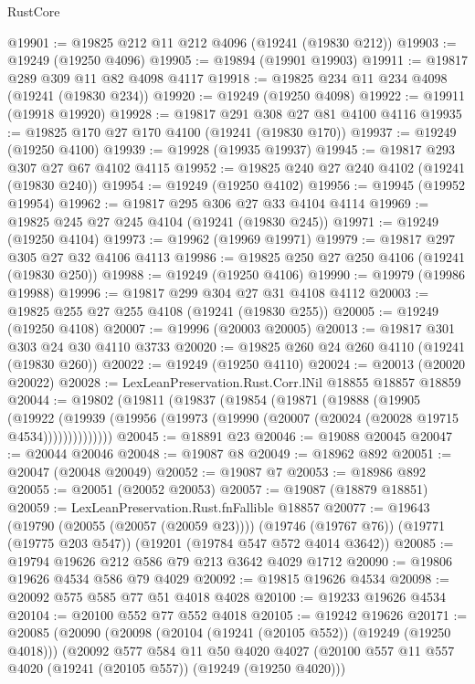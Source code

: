 \begin{lexlean}{RustCore}
\begin{coremodule}
@19901 := @19825 @212 @11 @212 @4096 (@19241 (@19830 @212))
@19903 := @19249 (@19250 @4096)
@19905 := @19894 (@19901 @19903)
@19911 := @19817 @289 @309 @11 @82 @4098 @4117
@19918 := @19825 @234 @11 @234 @4098 (@19241 (@19830 @234))
@19920 := @19249 (@19250 @4098)
@19922 := @19911 (@19918 @19920)
@19928 := @19817 @291 @308 @27 @81 @4100 @4116
@19935 := @19825 @170 @27 @170 @4100 (@19241 (@19830 @170))
@19937 := @19249 (@19250 @4100)
@19939 := @19928 (@19935 @19937)
@19945 := @19817 @293 @307 @27 @67 @4102 @4115
@19952 := @19825 @240 @27 @240 @4102 (@19241 (@19830 @240))
@19954 := @19249 (@19250 @4102)
@19956 := @19945 (@19952 @19954)
@19962 := @19817 @295 @306 @27 @33 @4104 @4114
@19969 := @19825 @245 @27 @245 @4104 (@19241 (@19830 @245))
@19971 := @19249 (@19250 @4104)
@19973 := @19962 (@19969 @19971)
@19979 := @19817 @297 @305 @27 @32 @4106 @4113
@19986 := @19825 @250 @27 @250 @4106 (@19241 (@19830 @250))
@19988 := @19249 (@19250 @4106)
@19990 := @19979 (@19986 @19988)
@19996 := @19817 @299 @304 @27 @31 @4108 @4112
@20003 := @19825 @255 @27 @255 @4108 (@19241 (@19830 @255))
@20005 := @19249 (@19250 @4108)
@20007 := @19996 (@20003 @20005)
@20013 := @19817 @301 @303 @24 @30 @4110 @3733
@20020 := @19825 @260 @24 @260 @4110 (@19241 (@19830 @260))
@20022 := @19249 (@19250 @4110)
@20024 := @20013 (@20020 @20022)
@20028 := LexLeanPreservation.Rust.Corr.lNil @18855 @18857 @18859
@20044 := @19802
    (@19811
      (@19837
        (@19854
          (@19871
            (@19888
              (@19905
                (@19922
                  (@19939 (@19956 (@19973 (@19990 (@20007 (@20024 (@20028 @19715 @4534))))))))))))))
@20045 := @18891 @23
@20046 := @19088 @20045
@20047 := @20044 @20046
@20048 := @19087 @8
@20049 := @18962 @892
@20051 := @20047 (@20048 @20049)
@20052 := @19087 @7
@20053 := @18986 @892
@20055 := @20051 (@20052 @20053)
@20057 := @19087 (@18879 @18851)
@20059 := LexLeanPreservation.Rust.fnFallible @18857
@20077 := @19643
    (@19790 (@20055 (@20057 (@20059 @23))))
    (@19746 (@19767 @76))
    (@19771 (@19775 @203 @547))
    (@19201 (@19784 @547 @572 @4014 @3642))
@20085 := @19794 @19626 @212 @586 @79 @213 @3642 @4029 @1712
@20090 := @19806 @19626 @4534 @586 @79 @4029
@20092 := @19815 @19626 @4534
@20098 := @20092 @575 @585 @77 @51 @4018 @4028
@20100 := @19233 @19626 @4534
@20104 := @20100 @552 @77 @552 @4018
@20105 := @19242 @19626
@20171 := @20085
    (@20090
      (@20098
        (@20104 (@19241 (@20105 @552)) (@19249 (@19250 @4018)))
        (@20092
          @577
          @584
          @11
          @50
          @4020
          @4027
          (@20100 @557 @11 @557 @4020 (@19241 (@20105 @557)) (@19249 (@19250 @4020)))

\end{coremodule}
\end{lexlean}
